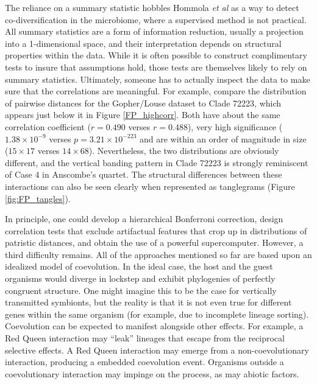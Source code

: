 

The reliance on a summary statistic hobbles Hommola {\em et al} as a way to detect co-diversification in the microbiome, where a supervised method is not practical. All summary statistics are a form of information reduction, usually a projection into a 1-dimensional space, and their interpretation depends on structural properties within the data. While it is often possible to construct complimentary tests to insure that assumptions hold, those tests are themselves likely to rely on summary statistics. Ultimately, someone has to actually inspect the data to make sure that the correlations are meaningful. \cite{anscombe1973graphs} For example, compare the distribution of pairwise distances for the Gopher/Louse dataset \cite{hafner1994disparate} to Clade 72223, which appears just below it in Figure \ref{FP_highcorr}. Both have about the same correlation coefficient ($r=0.490$ verses $r=0.488$), very high significance ($1.38\times 10^{-9}$ verses $p=3.21\times 10^{-223}$ and are within an order of magnitude in size ($15 \times 17$ verses $14 \times 68$). Nevertheless, the two distributions are obviously different, and the vertical banding pattern in Clade 72223 is strongly reminiscent of Case 4 in Anscombe's quartet. The structural differences between these interactions can also be seen clearly when represented as tanglegrams (Figure \ref{fig:FP_tangles}).



In principle, one could develop a hierarchical Bonferroni correction, design correlation tests that exclude artifactual features that crop up in distributions of patristic distances, and obtain the use of a powerful supercomputer. However, a third difficulty remains. All of the approaches mentioned so far are based upon an idealized model of coevolution. In the ideal case, the host and the guest organisms would diverge in lockstep and exhibit phylogenies of perfectly congruent structure. One might imagine this to be the case for vertically transmitted symbionts, but the reality is that it is not even true for different genes within the same organism (for example, due to incomplete lineage sorting). Coevolution can be expected to manifest alongside other effects. For example, a Red Queen interaction may ``leak'' lineages that escape from the reciprocal selective effects. A Red Queen interaction may emerge from a non-coevolutionary interaction, producing a embedded coevolution event. Organisms outside a coevolutionary interaction may impinge on the process, as may abiotic factors.

